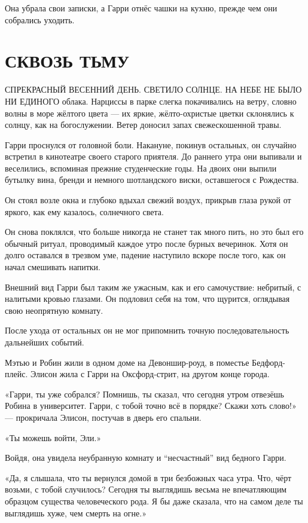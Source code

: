 \documentclass[a5paper, 9pt,
final, openany, twoside=true]{memoir}
\begin{document}
Она убрала свои записки, а Гарри отнёс чашки на кухню, прежде чем они собрались уходить.
\chapter{СКВОЗЬ ТЬМУ}
С{ ПРЕКРАСНЫЙ ВЕСЕННИЙ ДЕНЬ. СВЕТИЛО СОЛНЦЕ. НА НЕБЕ НЕ БЫЛО НИ ЕДИНОГО} облака. Нарциссы в парке слегка покачивались на ветру, словно волны в море жёлтого цвета — их яркие, жёлто-охристые цветки склонялись к солнцу, как на богослужении. Ветер доносил запах свежескошенной травы.\bigskip

Гарри проснулся от головной боли. Накануне, покинув остальных, он случайно встретил в кинотеатре своего старого приятеля. До раннего утра они выпивали и веселились, вспоминая прежние студенческие годы. На двоих они выпили бутылку вина, бренди и немного шотландского виски, оставшегося с Рождества.

Он стоял возле окна и глубоко вдыхал свежий воздух, прикрыв глаза рукой от яркого, как ему казалось, солнечного света.

Он снова поклялся, что больше никогда не станет так много пить, но это был его обычный ритуал, проводимый каждое утро после бурных вечеринок. Хотя он долго оставался в трезвом уме, падение наступило вскоре после того, как он начал смешивать напитки.

Внешний вид Гарри был таким же ужасным, как и его самочуствие: небритый, с налитыми кровью глазами. Он подловил себя на том, что щурится, оглядывая свою неопрятную комнату.

После ухода от остальных он не мог припомнить точную последовательность дальнейших событий.

Мэтью и Робин жили в одном доме на Девоншир-роуд, в поместье Бедфорд-плейс. Элисон жила с Гарри на Оксфорд-стрит, на другом конце города.\bigskip

«Гарри, ты уже собрался? Помнишь, ты сказал, что сегодня утром отвезёшь Робина в университет. Гарри, с тобой точно всё в порядке? Скажи хоть слово!» — прокричала Элисон, постучав в дверь его спальни.

«Ты можешь войти, Эли.»

Войдя, она увидела неубранную комнату и ``несчастный'' вид бедного Гарри.

«Да, я слышала, что ты вернулся домой в три безбожных часа утра. Что, чёрт возьми, с тобой случилось? Сегодня ты выглядишь весьма не впечатляющим образцом существа человеческого рода. Я бы даже сказала, что на самом деле ты выглядишь хуже, чем смерть на огне.»
\end{document}
